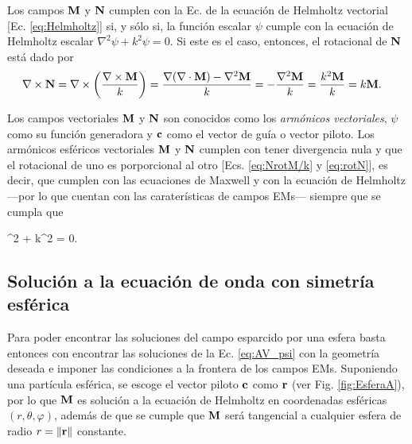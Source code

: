 Los campos $\vb{M}$ y $\vb{N}$ cumplen con la Ec. de la ecuación de Helmholtz vectorial [Ec. \eqref{eq:Helmholtz}] si, y sólo si, la función escalar $\psi$ cumple con la ecuación de Helmholtz escalar $\nabla^2 \psi + k^2 \psi = 0$. Si este es el caso, entonces, el rotacional de $\vb{N}$ está dado por
	\begin{align}
	\nabla\times \vb{N} &= \nabla\times \qty(\frac{\nabla\times \vb{M}}{k})  
						= \frac{\nabla\qty(\nabla\cdot\vb{M})-\nabla^2\vb{M}}{k}
						= - \frac{\nabla^2 \vb{M}}{k}
						= \frac{k^2 \vb{M}}{k}
						= k \vb{M}.\label{eq:rotN}
	\end{align}
	
Los campos vectoriales $\vb{M}$ y $\vb{N}$ son conocidos como los \emph{armónicos  vectoriales}, $\psi$ como su función generadora y $\vb{c}$ como el vector de guía o vector piloto. Los armónicos esféricos vectoriales $\vb{M}$ y $\vb{N}$  cumplen con tener divergencia nula y que el rotacional de uno es porporcional al otro [Ecs. \eqref{eq:NrotM/k} y \eqref{eq:rotN}], es decir, que cumplen con las ecuaciones de Maxwell y con la ecuación de Helmholtz ---por lo que cuentan con las caraterísticas de campos EMs--- siempre que se cumpla que
	\begin{tcolorbox}[title = $\mathbf{\psi}$: Función generadora de los armónicos  vectoriales, ams align ]
	\nabla^2 \psi + k^2 \psi  = 0.\label{eq:AV_psi}
	\end{tcolorbox}

	\subsection{Solución a la ecuación de onda con simetría esférica}


Para poder encontrar las soluciones del campo esparcido por una esfera basta entonces con encontrar las soluciones de la Ec. \eqref{eq:AV_psi} con la geometría deseada e imponer las condiciones a la frontera de los campos EMs. Suponiendo una partícula esférica, se escoge el vector piloto $\vb{c}$ como $\vb{r}$ (ver Fig. \ref{fig:EsferaA}), por lo que $\vb{M}$ es solución a la ecuación de Helmholtz en coordenadas esféricas $(r,\theta, \varphi)$, además de que se cumple que $\vb{M}$ será tangencial a cualquier esfera de radio $r=\norm{\vb{r}}$ constante.

